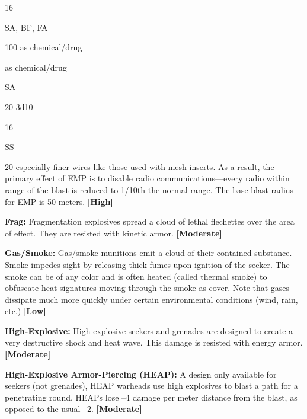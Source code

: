 16

SA, BF, FA

100
as chemical/drug

as chemical/drug

SA

20
3d10

16

SS

20
especially finer wires like those used with mesh inserts. 
As a result, the primary effect of EMP is to disable 
radio communications—every radio within range of 
the blast is reduced to 1/10th the normal range. The 
base blast radius for EMP is 50 meters. \textbf{[High]}

\textbf{Frag:} Fragmentation explosives spread a cloud of 
lethal flechettes over the area of effect. They are resisted
with kinetic armor. \textbf{[Moderate]}

\textbf{Gas/Smoke:} Gas/smoke munitions emit a cloud of 
their contained substance. Smoke impedes sight by 
releasing thick fumes upon ignition of the seeker. The 
smoke can be of any color and is often heated (called 
thermal smoke) to obfuscate heat signatures moving 
through the smoke as cover. Note that gases dissipate 
much more quickly under certain environmental conditions
(wind, rain, etc.) \textbf{[Low]}

\textbf{High-Explosive: }High-explosive seekers and grenades
are designed to create a very destructive shock
and heat wave. This damage is resisted with energy 
armor. \textbf{[Moderate]}

\textbf{High-Explosive Armor-Piercing (HEAP):} A design 
only available for seekers (not grenades), HEAP 
warheads use high explosives to blast a path for 
a penetrating round. HEAPs lose –4 damage per 
meter distance from the blast, as opposed to the 
usual –2. \textbf{[Moderate]}

